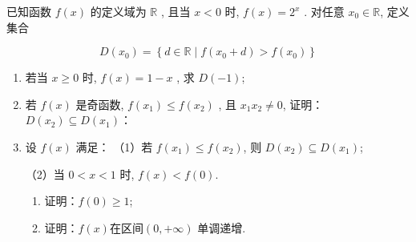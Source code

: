 \documentclass{exam-zh}
\begin{document}
\begin{problem}[points=17]
  已知函数 $f(x)$  的定义域为 $\mathbb{R} $ , 且当 $x<0 $ 时,  $f(x)=2^{x} $ .
  对任意 $x_{0} \in \mathbb{R}$, 定义集合

  \begin{equation*}
    D\left(x_{0}\right)=\left\{d \in \mathbb{R} \mid
    f\left(x_{0}+d\right)>f\left(x_{0}\right)\right\}
  \end{equation*}

  \begin{enumerate}
    \item 若当  $x \geqslant 0$  时, $ f(x)=1-x$  , 求  $D(-1)$;
    \item 若  $f(x) $ 是奇函数, $ f\left(x_{1}\right) \leqslant
      f\left(x_{2}\right) $ ,
      且 $ x_{1} x_{2} \neq 0$, 证明：$D\left(x_{2}\right) \subseteq
      D\left(x_{1}\right)$：
    \item 设 $ f(x)$  满足：
      （1）若 $ f\left(x_{1}\right) \leqslant f\left(x_{2}\right)$, 则
      $D\left(x_{2}\right) \subseteq D\left(x_{1}\right)$;

      （2）当 $ 0<x<1$  时,  $ f(x)<f(0) $.

      \begin{enumerate}
        \item  证明：$ f(0) \geqslant 1 $;
        \item 证明：$ f(x)  $在区间$  (0,+\infty) $ 单调递增.
      \end{enumerate}
  \end{enumerate}
\end{problem}
\end{document}
